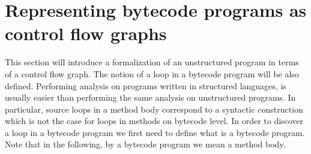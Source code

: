 \newtheorem{defEdge}{Definition}[section]
\newtheorem{defLoop}[defEdge]{Definition}
\newtheorem{defInter}[defEdge]{Definition}
\newtheorem{defExc}[defEdge]{Definition}
\newtheorem{defInv}[defEdge]{Definition}
\newtheorem{defModif}[defEdge]{Definition}

\newtheorem{propPath}{Lemma}[section]

\section{Representing bytecode programs as control flow graphs}\label{prelim}

This section will introduce a formalization of an unstructured program in terms of a control flow graph.
The notion of a loop in a bytecode program will be also defined.
Performing analysis on programs written in  structured languages, is usually easier than performing the same analysis 
on unstructured programs. In particular, source loops in a method body correspond to a syntactic construction which is not the 
case for loops in methods on bytecode level. In order to discover a loop in a bytecode program we first need to define 
what is a bytecode program. Note that in the following, by a  bytecode program we mean a method body.

